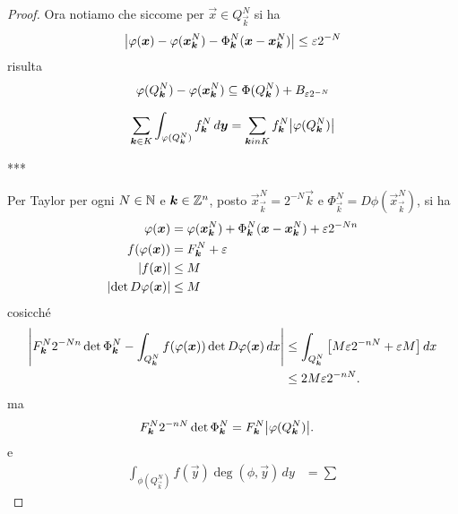 \begin{proof}
Ora notiamo che siccome per $\vec x \in Q^N_{\vec k}$ si ha 
\[
  {\left|
    \varphi(\boldsymbol x) - \varphi(\boldsymbol x^N_{\boldsymbol k}) 
    - \Phi^N_{\boldsymbol k}(\boldsymbol x - \boldsymbol x^N_{\boldsymbol k})\right|} \le \varepsilon 2^{-N}
\]
risulta 
\begin{align*}
 \varphi(Q^N_{\boldsymbol k}) - \varphi(\boldsymbol x^N_{\boldsymbol k}) \subseteq \Phi(Q^N_{\boldsymbol k})+B_{\varepsilon 2^{-N}}
\end{align*}

\begin{align*}
\sum_{\boldsymbol k \in K}
  \int_{\varphi(Q^N_{\boldsymbol k})} f^N_{\boldsymbol k}\, d\boldsymbol y 
= \sum_{\boldsymbol k in K} f^N_{\boldsymbol k} {\left|\varphi(Q^N_{\boldsymbol k})\right|}
\end{align*}

***

Per Taylor per ogni $N\in {\mathbb N}$ e $\boldsymbol k\in {\mathbb Z}^n$,
posto ${\vec x}^N_{\vec k} = 2^{-N}\vec k$ e $\Phi^N_{\vec k}=D\phi({\vec x}^N_{\vec k})$,
si ha 
\begin{align*}
  \varphi(\boldsymbol x) &= \varphi({\boldsymbol x}^N_{\boldsymbol k}) + \Phi^N_{\boldsymbol k} (\boldsymbol x - {\boldsymbol x}^N_{\boldsymbol k}) + \varepsilon 2^{-Nn}\\
  f(\varphi(\boldsymbol x)) &= F^N_{\boldsymbol k} + \varepsilon\\
  {\left|f(\boldsymbol x)\right|} & \le M\\
  {\left|\det D\varphi(\boldsymbol x)\right|} & \le M\\
\end{align*}
cosicché
\begin{align}
  {\left|
    F^N_{\boldsymbol k}  2^{-Nn} \det \Phi^N_{\boldsymbol k}
    - \int_{Q^N_{\boldsymbol k}} f(\varphi(\boldsymbol x)) \det D\varphi(\boldsymbol x)\, dx
  \right|}
  &\le \int_{Q^N_{\boldsymbol k}}  {\left[ M \varepsilon 2^{-nN} + \varepsilon M \right]}\, dx \\
  &\le 2M\varepsilon 2^{-nN}. 
\end{align}
ma 
\begin{align*}
    F^N_{\boldsymbol k} 2^{-nN} \det \Phi^N_{\boldsymbol k} 
    &= F^N_{\boldsymbol k}{\left|\varphi(Q^N_{\boldsymbol k})\right|}.
\end{align*}
e
\begin{align*}
  \int_{\phi(Q^N_{\vec k})} f(\vec y) \deg(\phi,\vec y)\, dy 
  &=
  \sum
\end{align*}
\end{proof}